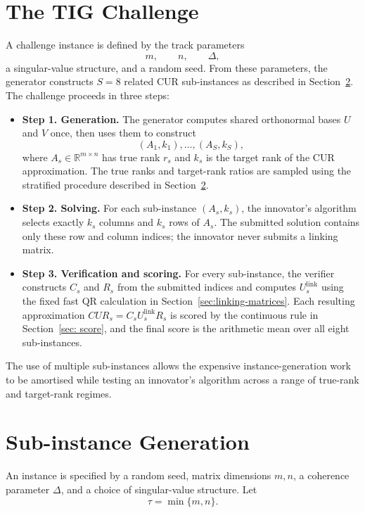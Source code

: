 \documentclass[12pt, legalpaper]{article}
\begin{document}
\section{The TIG Challenge}
A challenge instance is defined by the track parameters
\[
m,\qquad n,\qquad \Delta,
\]
a singular-value structure, and a random seed. From these parameters, the
generator constructs $S=8$ related CUR sub-instances as described in
Section~\ref{sec: instancegen}. The challenge proceeds in three steps:
\begin{itemize}
    \item \textbf{Step 1. Generation.} The generator computes shared
    orthonormal bases $U$ and $V$ once, then uses them to construct
    \[
    (A_1,k_1),\ldots,(A_S,k_S),
    \]
    where $A_s\in\mathbb{R}^{m\times n}$ has true rank $r_s$ and $k_s$ is
    the target rank of the CUR approximation. The true ranks and
    target-rank ratios are sampled using the stratified procedure described
    in Section~\ref{sec: instancegen}.
    \item \textbf{Step 2. Solving.} For each sub-instance $(A_s,k_s)$, the
    innovator's algorithm selects exactly $k_s$ columns and $k_s$ rows of
    $A_s$. The submitted solution contains only these row and column indices;
    the innovator never submits a linking matrix.
    \item \textbf{Step 3. Verification and scoring.} For every sub-instance,
    the verifier constructs $C_s$ and $R_s$ from the submitted indices and
    computes $U_s^{\mathrm{link}}$ using the fixed fast QR calculation in
    Section~\ref{sec:linking-matrices}. Each resulting approximation
    $CUR_s=C_sU_s^{\mathrm{link}}R_s$ is scored by the continuous rule in
    Section~\ref{sec: score}, and the final score is the arithmetic mean over
    all eight sub-instances.
\end{itemize}
The use of multiple sub-instances allows the expensive instance-generation
work to be amortised while testing an innovator's algorithm across a range
of true-rank and target-rank regimes.




\section{Sub-instance Generation}\label{sec: instancegen}

An instance is specified by a random seed, matrix dimensions $m,n$, a
coherence parameter $\Delta$, and a choice of singular-value structure.
Let
\[
\tau=\min\{m,n\}.
\]
\end{document}
